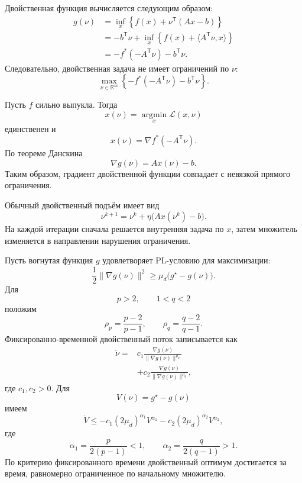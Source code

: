 Двойственная функция вычисляется следующим образом:
\[
\begin{aligned}
    g(\nu)
    &=
    \inf_x
    \left\{
        f(x)+\nu^{\mathsf T}(Ax-b)
    \right\}
    \\
    &=
    -b^{\mathsf T}\nu
    +
    \inf_x
    \left\{
        f(x)+\langle A^{\mathsf T}\nu,x\rangle
    \right\}
    \\
    &=
    -f^\ast(-A^{\mathsf T}\nu)
    -
    b^{\mathsf T}\nu.
\end{aligned}
\]
Следовательно, двойственная задача не имеет ограничений по \(\nu\):
\[
    \max_{\nu\in\mathbb R^m}
    \left\{
        -f^\ast(-A^{\mathsf T}\nu)
        -
        b^{\mathsf T}\nu
    \right\}.
\]

Пусть \(f\) сильно выпукла. Тогда
\[
    x(\nu)
    =
    \operatorname*{argmin}_x
    \mathcal L(x,\nu)
\]
единственен и
\[
    x(\nu)
    =
    \nabla f^\ast(-A^{\mathsf T}\nu).
\]
По теореме Данскина
\[
    \nabla g(\nu)=Ax(\nu)-b.
\]
Таким образом, градиент двойственной функции совпадает с невязкой
прямого ограничения.

Обычный двойственный подъём имеет вид
\[
    \nu^{k+1}
    =
    \nu^k
    +
    \eta
    \bigl(
        Ax(\nu^k)-b
    \bigr).
\]
На каждой итерации сначала решается внутренняя задача по \(x\), затем
множитель изменяется в направлении нарушения ограничения.

Пусть вогнутая функция \(g\) удовлетворяет PL-условию для
максимизации:
\[
    \frac12
    \lVert\nabla g(\nu)\rVert^2
    \ge
    \mu_d
    \bigl(
        g^\star-g(\nu)
    \bigr).
\]
Для
\[
    p>2,
    \qquad
    1<q<2
\]
положим
\[
    \rho_p=\frac{p-2}{p-1},
    \qquad
    \rho_q=\frac{q-2}{q-1}.
\]
Фиксированно-временной двойственный поток записывается как
\[
\begin{aligned}
    \dot\nu
    ={}&
    c_1
    \frac{\nabla g(\nu)}
    {\lVert\nabla g(\nu)\rVert^{\rho_p}}
    \\
    &+
    c_2
    \frac{\nabla g(\nu)}
    {\lVert\nabla g(\nu)\rVert^{\rho_q}},
\end{aligned}
\]
где \(c_1,c_2>0\). Для
\[
    V(\nu)=g^\star-g(\nu)
\]
имеем
\[
    \dot V
    \le
    -c_1(2\mu_d)^{\alpha_1}V^{\alpha_1}
    -
    c_2(2\mu_d)^{\alpha_2}V^{\alpha_2},
\]
где
\[
    \alpha_1
    =
    \frac{p}{2(p-1)}
    <1,
    \qquad
    \alpha_2
    =
    \frac{q}{2(q-1)}
    >1.
\]
По критерию фиксированного времени двойственный оптимум достигается за
время, равномерно ограниченное по начальному множителю.

